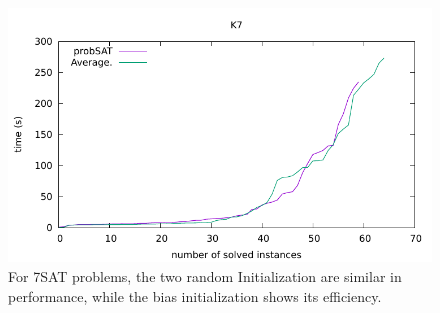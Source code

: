 \documentclass[12pt,a4paper,twoside]{scrartcl}
\numberwithin{equation}{section}
\begin{document}
  \begin{figure}[H]
\begin{center}
  \includegraphics[scale = 1]{DATA/K7/e4a.pdf}
  \end{center}
  \caption{For 7SAT problems, the two random Initialization are similar in performance, while the bias initialization shows its efficiency.}
  \label{Experiment 7 k7-w cactus plot}
  \end{figure}
\end{document}
